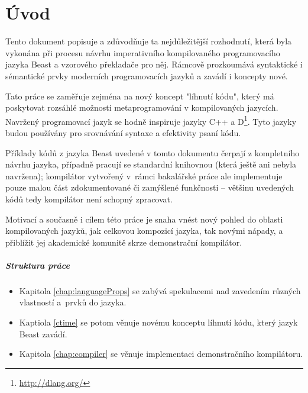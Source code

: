 
\newcommand{\ctimeNoXSpace}{\inlineCode{@ctime}}
\newcommand{\ctime}{\ctimeNoXSpace\xspace}
\newcommand{\nonctime}{ne-\inlineCode{@ctime}\xspace}

\renewcommand\chapterautorefname{kapitola}
\renewcommand\sectionautorefname{podkapitola}
\renewcommand\subsectionautorefname{oddíl}
\renewcommand\subsubsectionautorefname{pododdíl}

\chapter{Úvod}
Tento dokument popisuje a zdůvodňuje ta nejdůležitější rozhodnutí, která byla vykonána při procesu návrhu imperativního kompilovaného programovacího jazyka Beast a vzorového překladače pro něj. Rámcově prozkoumává syntaktické i sémantické prvky moderních programovacích jazyků a zavádí i koncepty nové.

Tato práce se zaměřuje zejména na nový koncept "líhnutí kódu", který má poskytovat rozsáhlé možnosti metaprogramování v kompilovaných jazycích. Navržený programovací jazyk se hodně inspiruje jazyky C++ a D\footnote{\url{http://dlang.org/}}. Tyto jazyky budou používány pro srovnávání syntaxe a efektivity psaní kódu.

Příklady kódů z jazyka Beast uvedené v tomto dokumentu čerpají z kompletního návrhu jazyka, případně pracují se standardní knihovnou (která ještě ani nebyla navržena); kompilátor vytvořený v~rámci bakalářské práce ale implementuje pouze malou část zdokumentované či zamýšlené funkčnosti -- většinu uvedených kódů tedy kompilátor není schopný zpracovat.

Motivací a současně i cílem této práce je snaha vnést nový pohled do oblasti kompilovaných jazyků, jak celkovou kompozicí jazyka, tak novými nápady, a přiblížit jej akademické komunitě skrze demonstrační kompilátor.

\paragraph{Struktura práce}
\begin{itemize}
	\item Kapitola \ref{chap:languageProps} se zabývá spekulacemi nad zavedením různých vlastností a~prvků do jazyka.
	\item Kaptiola \ref{ctime} se potom věnuje novému konceptu líhnutí kódu, který jazyk Beast zavádí.
	\item Kapitola \ref{chap:compiler} se věnuje implementaci demonstračního kompilátoru.
\end{itemize}

